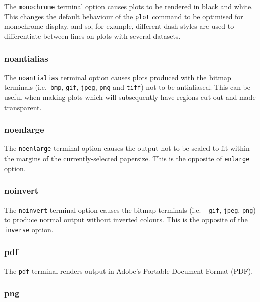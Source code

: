 The {\tt monochrome} terminal option causes plots to be rendered in black and
white. This changes the default behaviour of the {\tt plot} command to be
optimised for monochrome display, and so, for example, different dash styles
are used to differentiate between lines on plots with several datasets.


\subsubsection{noantialias}

The {\tt noantialias} terminal option causes plots produced with the bitmap
terminals (i.e.\ {\tt bmp}, {\tt gif}, {\tt jpeg}, {\tt png} and {\tt tiff})
not to be antialiased. This can be useful when making plots which will
subsequently have regions cut out and made transparent.


\subsubsection{noenlarge}

The {\tt noenlarge} terminal option causes the output not to be scaled to fit
within the margins of the currently-selected papersize. This is the opposite of
{\tt enlarge} option.


\subsubsection{noinvert}

The {\tt noinvert} terminal option causes the bitmap terminals (i.e.\ {\tt
gif}, {\tt jpeg}, {\tt png}) to produce normal output without inverted colours.
This is the opposite of the {\tt inverse} option.


\subsubsection{pdf}

The {\tt pdf} terminal renders output in Adobe's Portable Document Format
(PDF).


\subsubsection{png}

